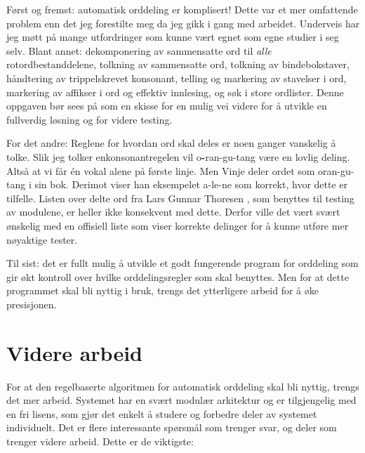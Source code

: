 Først og fremst: automatisk orddeling er komplisert! Dette var et mer omfattende problem enn det jeg forestilte meg da jeg gikk i gang med arbeidet. Underveis har jeg møtt på mange utfordringer som kunne vært egnet som egne studier i seg selv. Blant annet: dekomponering av sammensatte ord til \textit{alle} rotordbestanddelene, tolkning av sammensatte ord, tolkning av bindebokstaver, håndtering av trippelskrevet konsonant, telling og markering av stavelser i ord, markering av affikser i ord og effektiv innlesing, og søk i store ordlister. Denne oppgaven bør sees på som en skisse for en mulig vei videre for å utvikle en fullverdig løsning og for videre testing.

For det andre: Reglene for hvordan ord skal deles er noen ganger vanskelig å tolke. Slik jeg tolker enkonsonantregelen vil o\textbf{-}ran-gu-tang være en lovlig deling. Altså at vi får én vokal alene på første linje. Men Vinje deler ordet som oran-gu-tang i sin bok. Derimot viser han eksempelet a-le-ne som korrekt, hvor dette er tilfelle. Listen over delte ord fra Lars Gunnar Thoresen \cite{thoresen1993virtuelle}, som benyttes til testing av modulene, er heller ikke konsekvent med dette. Derfor ville det vært svært ønskelig med en offisiell liste som viser korrekte delinger for å kunne utføre mer nøyaktige tester.

Til sist: det er fullt mulig å utvikle et godt fungerende program for orddeling som gir økt kontroll over hvilke orddelingsregler som skal benyttes. Men for at dette programmet skal bli nyttig i bruk, trengs det ytterligere arbeid for å øke presisjonen.


\section{Videre arbeid}
\label{sec:videre-arbeid}

For at den regelbaserte algoritmen for automatisk orddeling skal bli nyttig, trengs det mer arbeid. Systemet har en svært modulær arkitektur og er tilgjengelig med en fri lisens, som gjør det enkelt å studere og forbedre deler av systemet individuelt. Det er flere interessante spørsmål som trenger svar, og deler som trenger videre arbeid. Dette er de viktigste:


